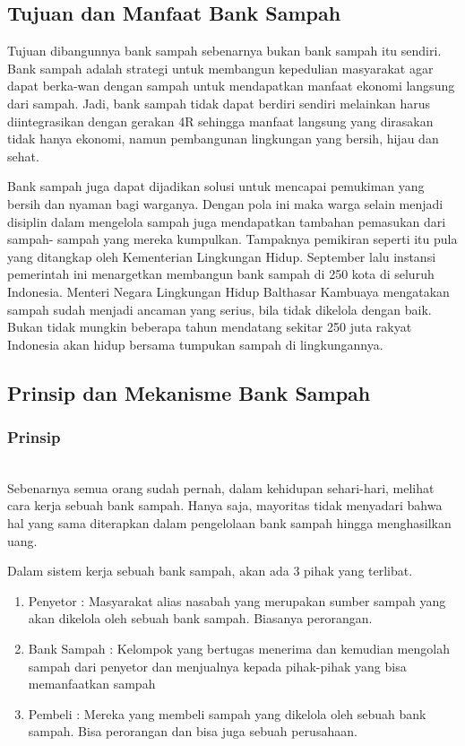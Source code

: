 \subsection{Tujuan dan Manfaat Bank Sampah}
Tujuan dibangunnya bank sampah sebenarnya bukan bank sampah itu sendiri. Bank sampah adalah strategi untuk membangun kepedulian masyarakat agar dapat berka-wan dengan sampah untuk mendapatkan manfaat ekonomi langsung dari sampah. Jadi, bank sampah tidak dapat berdiri sendiri melainkan harus diintegrasikan dengan gerakan 4R sehingga manfaat langsung yang dirasakan tidak hanya ekonomi, namun pembangunan lingkungan yang bersih, hijau dan sehat.

Bank sampah juga dapat dijadikan solusi untuk mencapai pemukiman yang bersih dan nyaman bagi warganya. Dengan pola ini maka warga selain menjadi disiplin dalam mengelola sampah juga mendapatkan tambahan pemasukan dari sampah- sampah yang mereka kumpulkan. Tampaknya pemikiran seperti itu pula yang ditangkap oleh Kementerian Lingkungan Hidup. September lalu instansi pemerintah ini menargetkan membangun bank sampah di 250 kota di seluruh Indonesia. Menteri Negara Lingkungan Hidup Balthasar Kambuaya mengatakan sampah sudah menjadi ancaman yang serius, bila tidak dikelola dengan baik. Bukan tidak mungkin beberapa tahun mendatang sekitar 250 juta rakyat Indonesia akan hidup bersama tumpukan sampah di lingkungannya.


\subsection{Prinsip dan Mekanisme Bank Sampah}
\subsubsection{Prinsip}
\hfill\\
Sebenarnya semua orang sudah pernah, dalam kehidupan sehari-hari, melihat cara kerja sebuah bank sampah. Hanya saja, mayoritas tidak menyadari bahwa hal yang sama diterapkan dalam pengelolaan bank sampah hingga menghasilkan uang.

Dalam sistem kerja sebuah bank sampah, akan ada 3 pihak yang terlibat.
\begin{enumerate}
	\item Penyetor : Masyarakat alias nasabah yang merupakan sumber sampah yang akan dikelola oleh sebuah bank sampah. Biasanya perorangan.

\item Bank Sampah : Kelompok yang bertugas menerima dan kemudian mengolah sampah dari penyetor dan menjualnya kepada pihak-pihak yang bisa memanfaatkan sampah

\item Pembeli : Mereka yang membeli sampah yang dikelola oleh sebuah bank sampah. Bisa perorangan dan bisa juga sebuah perusahaan.
\end{enumerate}

